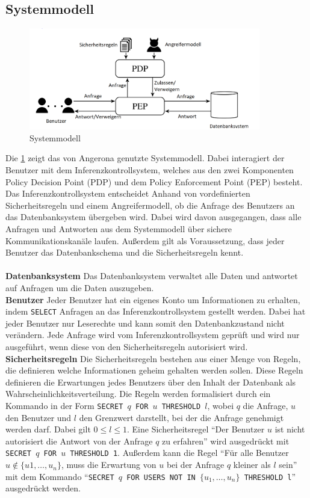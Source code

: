 \documentclass[german,version-2020-11]{uzl-thesis}
\begin{document}
\subsection{Systemmodell}
\begin{figure}[ht]
	\centering
	\includegraphics[width=0.9\textwidth]{System-model.PNG}
	\caption{Systemmodell}
	\label{fig1}
\end{figure}
\noindent 
Die \cref{fig1} zeigt das von Angerona genutzte Systemmodell. Dabei interagiert der Benutzer mit dem Inferenzkontrollsystem, welches aus den zwei Komponenten Policy Decision Point (PDP) und dem Policy Enforcement Point (PEP) besteht. Das Inferenzkontrollsystem entscheidet Anhand von vordefinierten Sicherheitsregeln und einem Angreifermodell, ob die Anfrage des Benutzers an das Datenbanksystem übergeben wird. Dabei wird davon ausgegangen, dass alle Anfragen und Antworten aus dem Systemmodell über sichere Kommunikationskanäle laufen. Außerdem gilt als Voraussetzung, dass jeder Benutzer das Datenbankschema und die Sicherheitsregeln kennt. \\ \\ 
\textbf{Datenbanksystem} Das Datenbanksystem verwaltet alle Daten und antwortet auf Anfragen um die Daten auszugeben. \\
\textbf{Benutzer} Jeder Benutzer hat ein eigenes Konto um Informationen zu erhalten, indem \texttt{SELECT} Anfragen an das Inferenzkontrollsystem gestellt werden. Dabei hat jeder Benutzer nur Leserechte und kann somit den Datenbankzustand nicht verändern. Jede Anfrage wird vom Inferenzkontrollsystem geprüft und wird nur ausgeführt, wenn diese von den Sicherheitsregeln autorisiert wird. \\ 
\textbf{Sicherheitsregeln} Die Sicherheitsregeln bestehen aus einer Menge von Regeln, die definieren welche Informationen geheim gehalten werden sollen. Diese Regeln definieren die Erwartungen jedes Benutzers über den Inhalt der Datenbank als Wahrscheinlichkeitsverteilung. Die Regeln werden formalisiert durch ein Kommando in der Form \texttt{SECRET $q$ FOR $u$ THRESHOLD $l$}, wobei $q$ die Anfrage, $u$ den Benutzer und $l$ den Grenzwert darstellt, bei der die Anfrage genehmigt werden darf. Dabei gilt $0 \leq l \leq 1$. Eine Sicherheitsregel \enquote{Der Benutzer $u$ ist nicht autorisiert die Antwort von der Anfrage $q$ zu erfahren} wird ausgedrückt mit \texttt{SECRET $q$ FOR $u$ THRESHOLD 1}. Außerdem kann die Regel \enquote{Für alle Benutzer $u \notin \{u1,\dots,u_n\}$, muss die Erwartung von $u$ bei der Anfrage $q$ kleiner als $l$ sein} mit dem Kommando \enquote{\texttt{SECRET $q$ FOR USERS NOT IN $\{u_1,\dots,u_n\}$ THRESHOLD l}} ausgedrückt werden.\\ 
\end{document}
